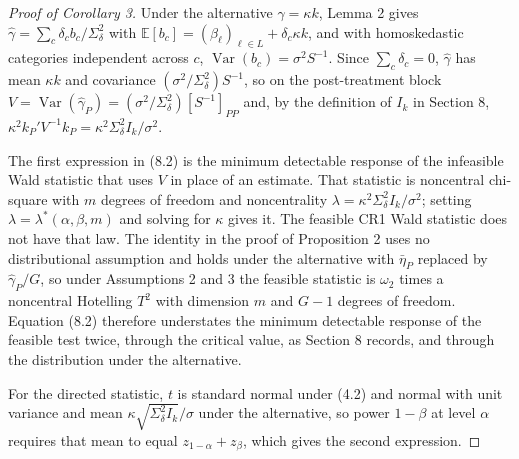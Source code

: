 \documentclass[12pt]{article}
\theoremstyle{definition}
\numberwithin{equation}{section}
\begin{document}
\begin{proof}[Proof of Corollary 3]
Under the alternative $\gamma = \kappa k$, Lemma 2 gives
$\hat{\gamma} = \sum_c \delta_c b_c/\Sigma_\delta^2$ with $\mathbb{E}[b_c] =
(\beta_\ell)_{\ell \in L} + \delta_c \kappa k$, and with homoskedastic
categories independent across
$c$, $\operatorname{Var}(b_c) = \sigma^2 S^{-1}$. Since $\sum_c \delta_c = 0$,
$\hat{\gamma}$ has mean $\kappa k$ and covariance $(\sigma^2/\Sigma_\delta^2)
S^{-1}$, so on the post-treatment block $V = \operatorname{Var}(\hat{\gamma}_P)
= (\sigma^2/\Sigma_\delta^2)[S^{-1}]_{PP}$ and, by the definition of $I_k$ in
Section 8, $\kappa^2 k_P'V^{-1}k_P = \kappa^2 \Sigma_\delta^2
I_k/\sigma^2$.

The first expression in (8.2) is the minimum detectable response of the
infeasible Wald statistic that uses $V$ in place of an estimate. That statistic
is noncentral chi-square with $m$ degrees of freedom and noncentrality
$\lambda = \kappa^2 \Sigma_\delta^2 I_k/\sigma^2$; setting $\lambda =
\lambda^*(\alpha,\beta,m)$ and solving for $\kappa$ gives it. The feasible CR1
Wald statistic does not have that law. The identity in the proof of Proposition
2 uses no distributional assumption and holds under the
alternative with $\bar{\eta}_P$ replaced by $\hat{\gamma}_P/G$, so under
Assumptions 2 and 3 the feasible statistic is $\omega_2$ times
a noncentral Hotelling $T^2$ with dimension $m$ and $G-1$ degrees of freedom.
Equation (8.2) therefore understates the minimum detectable response of
the feasible test twice, through the critical value, as Section 8
records, and through the distribution under the alternative.

For the directed statistic, $t$ is standard normal under (4.2) and
normal with unit variance and mean $\kappa \sqrt{\Sigma_\delta^2 I_k}/\sigma$
under the alternative, so power $1-\beta$ at level $\alpha$ requires that mean
to equal $z_{1-\alpha}+z_\beta$, which gives the second expression.
\end{proof}
\end{document}
